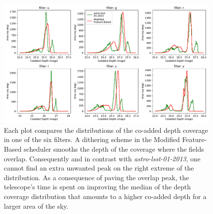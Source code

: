 \documentclass[12pt]{aastex62}
\theoremstyle{definition}
\begin{document}
\begin{figure}[h!]
\centering
\includegraphics[width=1.0\linewidth]{Figures/Co_addedHist10yrs.pdf}
\caption{Each plot compares the distributions of the co-added depth coverage in one of the six filters. A dithering scheme in the Modified Feature-Based scheduler smooths the depth of the coverage where the fields overlap. Consequently and in contrast with \textit{astro-lsst-01-2013}, one cannot find an extra unwanted peak on the right extreme of the distribution. As a consequence of paving the overlap peak, the telescope's time is spent on improving the median of the depth coverage distribution that amounts to a higher co-added depth for a larger area of the sky.}
\label{fig_10yrs_hist}
\end{figure}
\end{document}
